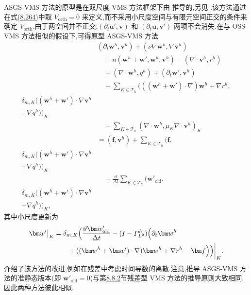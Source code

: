 \begin{note}
\label{note:vms-asgs-method}
ASGS-VMS 方法的原型是在双尺度 VMS 方法框架下由 \textcite{Codina2001b} 推导的,另见 \textcite{CodinaPrincipeGuaschBadia2007}.该方法通过在式\hyperref[eq:vms-oss-subscale-ansatz]{(8.264)}中取 $V_{\mathrm{orth}}=0$ 来定义,而不采用小尺度空间与有限元空间正交的条件来确定 $V_{\mathrm{orth}}$.由于两空间并不正交,$(\partial_t\bm u',\bm v)$ 和 $(\partial_t\bm u,\bm v')$ 两项不会消失.在与 OSS-VMS 方法相似的假设下,可得原型 ASGS-VMS 方法
\[
\begin{aligned}
 &(\partial_t\bm w^h,\bm v^h)
   +(\nu\nabla\bm w^h,\nabla\bm v^h)\\
 &\quad+n(\bm w^h+\bm w',\bm w^h,\bm v^h)
   -(\nabla\cdot\bm v^h,r^h)\\
 &\quad+(\nabla\cdot\bm w^h,q^h)
   +(\partial_t\bm w',\bm v^h)\\
 &\quad+\sum_{K\in\mathcal T_h}
   (((\bm w^h+\bm w')\cdot\nabla)\bm w^h+\nabla r^h,\\
      \delta_{m,K}((\bm w^h+\bm w')\cdot\nabla\bm v^h\\
      +\nabla q^h))_K\\
 &\quad+\sum_{K\in\mathcal T_h}
   (\nabla\cdot\bm w^h,\mu_K\nabla\cdot\bm v^h)_K\\
 &=(\bm f,\bm v^h)
   +\sum_{K\in\mathcal T_h}\bigl(\bm f,\\
       \delta_{m,K}((\bm w^h+\bm w')\cdot\nabla\bm v^h\\
       +\nabla q^h)\bigr)_K\\
 &\quad+\frac{\vartheta}{\Delta t}\sum_{K\in\mathcal T_h}
      (\bm w'_{\mathrm{old}},\\
        \delta_{m,K}((\bm w^h+\bm w')\cdot\nabla\bm v^h\\
        +\nabla q^h))_K,
\end{aligned}
\]
其中小尺度更新为
\[
\begin{aligned}
 \bm w'\big|_K
  &=\delta_{m,K}\Bigl(
    \frac{\vartheta\bm w'_{\mathrm{old}}}{\Delta t}
    -(I-P^h_{L^2})\Bigl(\partial_t\bm w^h\\
  &\qquad+((\bm w^h+\bm w')\cdot\nabla)\bm w^h
    +\nabla r^h-\bm f\Bigr)\Bigr)\bigg|_K.
\end{aligned}
\]
\textcite{ColomesBadiaCodinaPrincipe2015}介绍了该方法的改进,例如在残差中考虑时间导数的离散.注意,推导 ASGS-VMS 方法的准静态版本(即 $\bm w'_{\mathrm{old}}=0$)与第\hyperref[subsec:vms-residual-based-method]{8.8.2}节残差型 VMS 方法的推导原则大致相同,因此两种方法彼此相似.
\end{note}

